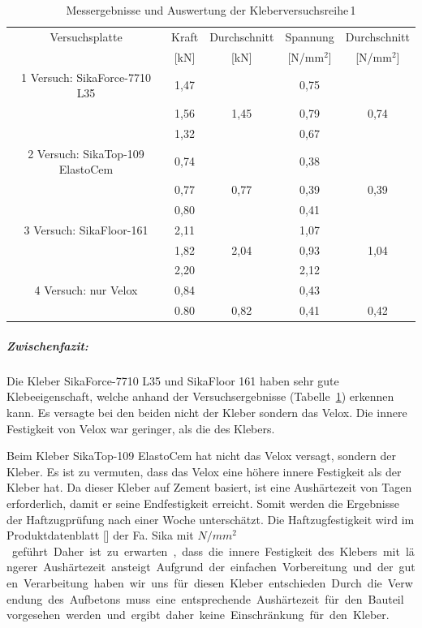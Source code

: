 \begin{table}[h!]
\caption{Messergebnisse und Auswertung der Kleberversuchsreihe\,1}
\begin{center}

\begin{tabular}{|c|c|c|c|c|} \hline
Versuchsplatte & Kraft & Durchschnitt & Spannung &Durchschnitt \\

	& [kN] & [kN] & [N/mm$^{2}$] & [N/mm$^{2}$] \\
	\hline\hline
 \cline{2-2} 1 Versuch: SikaForce-7710 L35  & 1,47 & & 0,75& \\\cline{2-2}&1,56 &1,45 &0,79 &0,74 \\\cline{2-2}&1,32 & &0,67 & 
\\\hline\hline

 \cline{2-2} 2 Versuch: SikaTop-109 ElastoCem  & 0,74 & & 0,38& \\\cline{2-2}&0,77 &0,77 &0,39 &0,39 \\\cline{2-2}&0,80 & &0,41 & 
\\\hline\hline

 \cline{2-2} 3 Versuch: SikaFloor-161  & 2,11 & & 1,07& \\\cline{2-2}&1,82 &2,04 &0,93 &1,04 \\\cline{2-2}&2,20 & &2,12 & 
\\\hline\hline


 \cline{2-2} 4 Versuch: nur Velox  & 0,84 & & 0,43& \\\cline{2-2}&0.80 &0,82 &0,41 &0,42 
\\\hline

\end{tabular}
 \label{tab:1 kleberversuche}

\end{center}
\end{table}



\newpage

\subparagraph{Zwischenfazit:}


Die Kleber SikaForce-7710 L35 und SikaFloor 161 haben sehr gute Klebeeigenschaft, welche anhand der Versuchsergebnisse (Tabelle\, \ref{tab:1 kleberversuche}) erkennen kann. Es versagte bei den beiden nicht der Kleber sondern das Velox. Die innere Festigkeit von Velox war geringer, als die des Klebers. 

Beim Kleber SikaTop-109 ElastoCem hat nicht das Velox versagt, sondern der Kleber. Es ist zu vermuten, dass das Velox eine höhere innere Festigkeit als der Kleber hat. Da dieser Kleber auf Zement basiert, ist eine Aushärtezeit von \unit [28]{Tagen} erforderlich, damit er seine Endfestigkeit erreicht.  Somit werden die Ergebnisse der Haftzugprüfung nach einer Woche unterschätzt.  Die Haftzugfestigkeit wird im Produktdatenblatt [] der Fa. Sika mit \unit[0,7]{$N/mm^{2}$} geführt. Daher ist zu erwarten, dass die innere Festigkeit des Klebers mit längerer Aushärtezeit ansteigt.
Aufgrund der einfachen Vorbereitung und der guten Verarbeitung haben wir uns für diesen Kleber entschieden. Durch die Verwendung des Aufbetons muss eine entsprechende Aushärtezeit für den Bauteil vorgesehen werden und ergibt daher  keine Einschränkung für den Kleber. 

